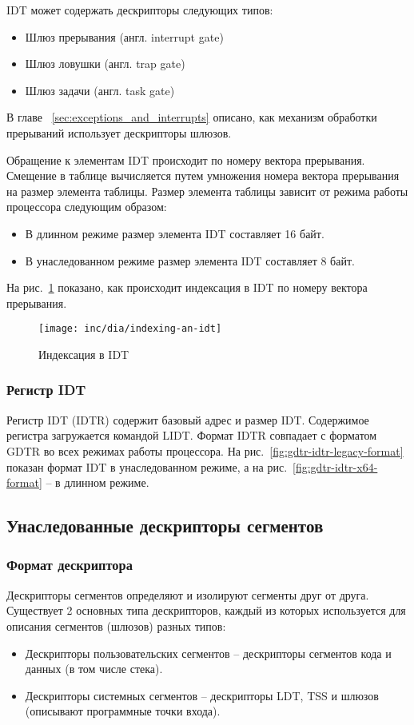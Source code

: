 IDT может содержать дескрипторы следующих типов:
\begin{itemize}
	\item Шлюз прерывания (англ. interrupt gate)
	\item Шлюз ловушки (англ. trap gate)
	\item Шлюз задачи (англ. task gate)
\end{itemize}

В главе ~\ref{sec:exceptions_and_interrupts} описано,
как механизм обработки прерываний использует дескрипторы шлюзов.

Обращение к элементам IDT происходит по номеру вектора прерывания. Смещение в таблице вычисляется путем
умножения номера вектора прерывания на размер элемента таблицы. Размер элемента таблицы зависит от
режима работы процессора следующим образом:
\begin{itemize}
\item В длинном режиме размер элемента IDT составляет 16 байт.
\item В унаследованном режиме размер элемента IDT составляет 8 байт.
\end{itemize}

На рис.~\ref{fig:indexing-an-idt} показано, как происходит индексация в IDT по номеру вектора прерывания.

\begin{figure}[ht!]
  \centering
  \texttt{[image: inc/dia/indexing-an-idt]}
  \caption{Индексация в IDT}
  \label{fig:indexing-an-idt}
\end{figure}


\subsubsection*{Регистр IDT}
Регистр IDT (IDTR) содержит базовый адрес и размер IDT.
Содержимое регистра загружается командой LIDT. Формат IDTR совпадает с форматом GDTR во
всех режимах работы процессора. На рис.~\ref{fig:gdtr-idtr-legacy-format} показан формат
IDT в унаследованном режиме, а на рис.~\ref{fig:gdtr-idtr-x64-format} -- в длинном режиме.

\subsection{Унаследованные дескрипторы сегментов}
\subsubsection*{Формат дескриптора}
Дескрипторы сегментов определяют и изолируют сегменты друг от друга. Существует 2 основных типа
дескрипторов, каждый из которых используется для описания сегментов (шлюзов) разных типов:
\begin{itemize}
	\item Дескрипторы пользовательских сегментов -- дескрипторы сегментов кода и данных (в том числе стека).
	\item Дескрипторы системных сегментов -- дескрипторы LDT, TSS и шлюзов (описывают программные точки входа).
\end{itemize}

